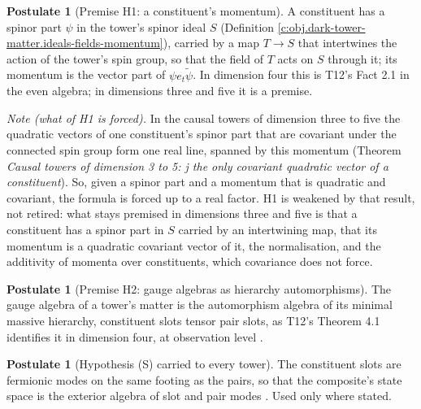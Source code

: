 \documentclass[11pt]{article}
\theoremstyle{definition}
\newtheorem{postulate}[theorem]{Postulate}
\theoremstyle{plain}
\newcommand{\changedmark}[2]{\marginpar{\raggedright\scriptsize\color{#1}#2}}
\providecommand{\rev}{}\renewcommand{\rev}[1]{\widetilde{#1}}
\begin{document}
\begin{postulate}[Premise H1: a constituent's momentum]\label{c:dark-tower-matter.h1-momentum}
\changedmark{BurntOrange}{changed since the deposit}
A constituent has a spinor part $\psi$ in the tower's spinor ideal $S$ (Definition \ref{c:obj.dark-tower-matter.ideals-fields-momentum}), carried by a map $T \to S$ that intertwines the action of the tower's spin group, so that the field of $T$ acts on $S$ through it; its momentum is the vector part of $\psi e_{t}\rev{\psi}$. In dimension four this is T12's Fact 2.1 in the even algebra; in dimensions three and five it is a premise.

\emph{Note (what of H1 is forced).} In the causal towers of dimension three to five the quadratic vectors of one constituent's spinor part that are covariant under the connected spin group form one real line, spanned by this momentum (Theorem \emph{Causal towers of dimension 3 to 5: j the only covariant quadratic vector of a constituent}). So, given a spinor part and a momentum that is quadratic and covariant, the formula is forced up to a real factor. H1 is weakened by that result, not retired: what stays premised in dimensions three and five is that a constituent has a spinor part in $S$ carried by an intertwining map, that its momentum is a quadratic covariant vector of it, the normalisation, and the additivity of momenta over constituents, which covariance does not force.
\end{postulate}

\begin{postulate}[Premise H2: gauge algebras as hierarchy automorphisms]\label{c:dark-tower-matter.h2-identification}
The gauge algebra of a tower's matter is the automorphism algebra of its minimal massive hierarchy, constituent slots tensor pair slots, as T12's Theorem 4.1 identifies it in dimension four, at observation level \cite[Thm.~4.1, Prop.~4.3]{ButlerT12}.
\end{postulate}

\begin{postulate}[Hypothesis (S) carried to every tower]\label{c:dark-tower-matter.hypothesis-s-slot-statistics}
The constituent slots are fermionic modes on the same footing as the pairs, so that the composite's state space is the exterior algebra of slot and pair modes \cite[Sec.~5]{ButlerT12}. Used only where stated.
\end{postulate}
\end{document}
